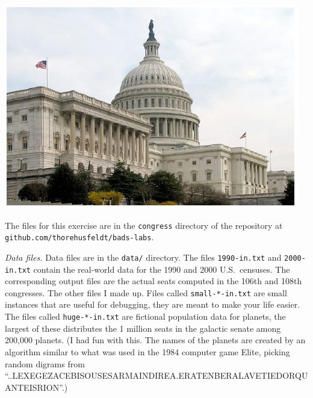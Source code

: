 \documentclass[9pt]{memoir}
\begin{document}
\begin{multicols}{2}

\noindent
\includegraphics[width=\columnwidth]{congressphoto.pdf}



\end{multicols}


\noindent The files for this exercise are in the \texttt{congress}
directory of the repository at \texttt{github.com/thorehusfeldt/bads-labs}.

\bigskip
\noindent
\emph{Data files.}
Data files are in the \texttt{data/} directory.
The files \texttt{1990-in.txt} and \texttt{2000-in.txt} contain the real-world data
for the 1990 and 2000 U.S.\ censuses.
The corresponding output files are the actual seats computed in the
106th and 108th congresses.
The other files I made up.
Files called \texttt{small-*-in.txt} are small instances that are useful for
debugging, they are meant to make your life easier.
The files called \texttt{huge-*-in.txt} are fictional population data for
planets, the largest of these distributes the 1 million seats in the
galactic senate among 200,000 planets.
(I had fun with this.
The names of the planets are created by an algorithm similar to what
was used in the 1984 computer game Elite, picking random digrams from
``..LEXEGEZACEBISOUSESARMAINDIREA.ERATENBERALAVETIEDORQUANTEISRION''.)
\end{document}
